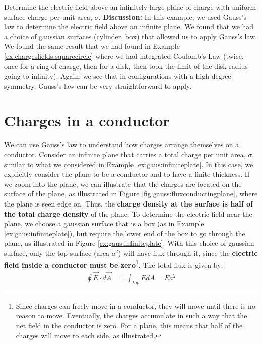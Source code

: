 \begin{example}{Determine the electric field above an infinitely large plane of charge with uniform surface charge per unit area, $\sigma$.}
\textbf{Discussion: }In this example, we used Gauss's law to determine the electric field above an infinite plane. We found that we had a choice of gaussian surfaces (cylinder, box) that allowed us to apply Gauss's law. We found the same result that we had found in Example \ref{ex:chargesfields:squarecircle} where we had integrated Coulomb's Law (twice, once for a ring of charge, then for a disk, then took the limit of the disk radius going to infinity). Again, we see that in configurations with a high degree symmetry, Gauss's law can be very straightforward to apply.
\end{example}

\section{Charges in a conductor}
\label{sec:gauss:conductors}
We can use Gauss's law to understand how charges arrange themselves on a conductor. Consider an infinite plane that carries a total charge per unit area, $\sigma$, similar to what we considered in Example \ref{ex:gaus:infiniteplate}. In this case, we explicitly consider the plane to be a conductor and to have a finite thickness. If we zoom into the plane, we can illustrate that the charges are located on the surface of the plane, as illustrated in Figure \ref{fig:gauss:fluxconductingplane}, where the plane is seen edge on. Thus, the \textbf{charge density at the surface is half of the total charge density} of the plane.
To determine the electric field near the plane, we choose a gaussian surface that is a box (as in Example \ref{ex:gaus:infiniteplate}), but require the lower end of the box to go through the plane, as illustrated in Figure \ref{ex:gaus:infiniteplate}. With this choice of gaussian surface, only the top surface (area $a^2$) will have flux through it, since the \textbf{electric field inside a conductor must be zero}\footnote{Since charges can freely move in a conductor, they will move until there is no reason to move. Eventually, the charges accumulate in such a way that the net field in the conductor is zero. For a plane, this means that half of the charges will move to each side, as illustrated.}. The total flux is given by:
\begin{align*}
\oint \vec E\cdot d\vec A&= \int_{top} EdA=Ea^2
\end{align*}
